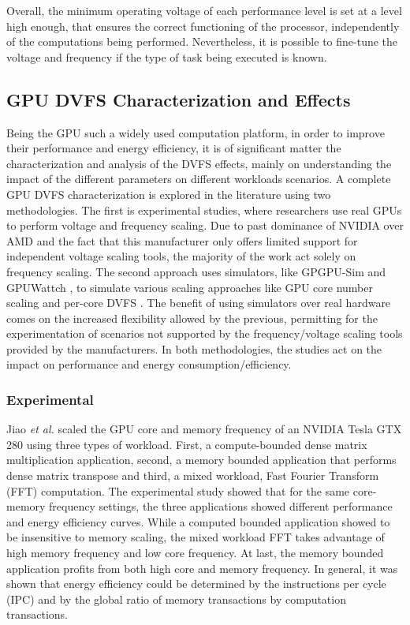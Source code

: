 Overall, the minimum operating voltage of each performance level is set at a level high enough, that ensures the correct functioning of the processor, independently of the computations being performed. Nevertheless, it is possible to fine-tune the voltage and frequency if the type of task being executed is known.

\subsection{GPU DVFS Characterization and Effects}

Being the GPU such a widely used computation platform, in order to improve their performance and energy efficiency, it is of significant matter the characterization and analysis of the DVFS effects, mainly on understanding the impact of the different parameters on different workloads scenarios. A complete GPU DVFS characterization is explored in the literature using two methodologies. The first is experimental studies, where researchers use real GPUs to perform voltage and frequency scaling. Due to past dominance of NVIDIA over AMD \cite{noauthor_jon_nodate} \cite{mujtaba_amd_2019} and the fact that this manufacturer only offers limited support for independent voltage scaling tools, the majority of the work act solely on frequency scaling. The second approach uses simulators, like GPGPU-Sim \cite{noauthor_gpgpu-sim/gpgpu-sim_distribution_2019} and GPUWattch \cite{noauthor_gpu_nodate} \cite{leng_gpuwattch:_2013},  to simulate various scaling approaches like GPU core number scaling and per-core DVFS \cite{mei_survey_2016}. The benefit of using simulators over real hardware comes on the increased flexibility allowed by the previous, permitting for the experimentation of scenarios not supported by the frequency/voltage scaling tools provided by the manufacturers. In both methodologies, the studies act on the impact on performance and energy consumption/efficiency.

\subsubsection{Experimental}

Jiao \textit{et al.} \cite{jiao_power_2010} scaled the GPU core and memory frequency of an NVIDIA Tesla GTX 280 using three types of workload. First, a compute-bounded dense matrix multiplication application, second, a memory bounded application that performs dense matrix transpose and third, a mixed workload, Fast Fourier Transform (FFT) computation. The experimental study showed that for the same core-memory frequency settings, the three applications showed different performance and energy efficiency curves. While a computed bounded application showed to be insensitive to memory scaling, the mixed workload FFT takes advantage of high memory frequency and low core frequency. At last, the memory bounded application profits from both high core and memory frequency. In general, it was shown that energy efficiency could be determined by the instructions per cycle (IPC) and by the global ratio of memory transactions by computation transactions.

